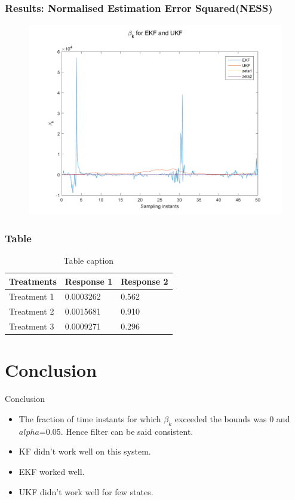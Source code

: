 \documentclass{beamer}
\begin{document}
\begin{frame}
\frametitle{Results: Normalised Estimation Error Squared(NESS)}
\begin{figure}
\includegraphics[width=1.0\linewidth]{betak_noKF.png}
\end{figure}
\end{frame}

\begin{frame}
\frametitle{Table}
\begin{table}
\begin{tabular}{l l l}
\toprule
\textbf{Treatments} & \textbf{Response 1} & \textbf{Response 2}\\
\midrule
Treatment 1 & 0.0003262 & 0.562 \\
Treatment 2 & 0.0015681 & 0.910 \\
Treatment 3 & 0.0009271 & 0.296 \\
\bottomrule
\end{tabular}
\caption{Table caption}
\end{table}
\end{frame}

\section{Conclusion}
\begin{frame}{Conclusion}
    \begin{itemize}
        \item The fraction of time instants for which $\beta_k$ exceeded the bounds was 0 and $alpha$=0.05. Hence filter can be said consistent.
        \item KF didn't work well on this system.
        \item EKF worked well.
        \item UKF didn't work well for few states.
    \end{itemize}
\end{frame}
\end{document}
